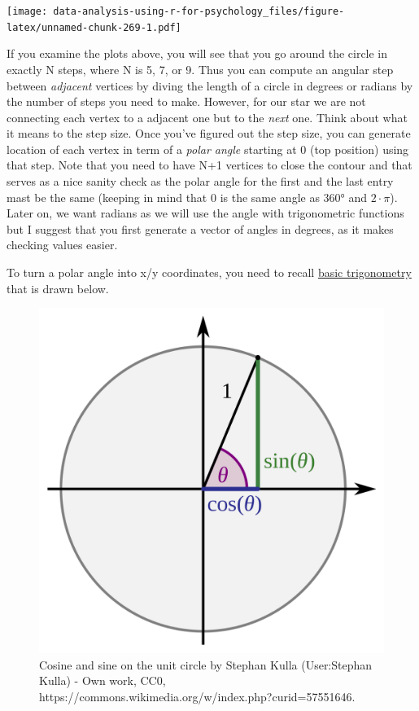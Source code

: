\documentclass[
]{book}
\begin{document}
\texttt{[image: data-analysis-using-r-for-psychology\_files/figure-latex/unnamed-chunk-269-1.pdf]}

If you examine the plots above, you will see that you go around the circle in exactly N steps, where N is 5, 7, or 9. Thus you can compute an angular step between \emph{adjacent} vertices by diving the length of a circle in degrees or radians by the number of steps you need to make. However, for our star we are not connecting each vertex to a adjacent one but to the \emph{next} one. Think about what it means to the step size. Once you've figured out the step size, you can generate location of each vertex in term of a \emph{polar angle} starting at 0 (top position) using that step. Note that you need to have N+1 vertices to close the contour and that serves as a nice sanity check as the polar angle for the first and the last entry mast be the same (keeping in mind that 0 is the same angle as 360° and \(2\cdot\pi\)). Later on, we want radians as we will use the angle with trigonometric functions but I suggest that you first generate a vector of angles in degrees, as it makes checking values easier.

To turn a polar angle into x/y coordinates, you need to recall \href{https://en.wikipedia.org/wiki/List_of_trigonometric_identities}{basic trigonometry} that is drawn below.

\begin{figure}

{\centering \includegraphics[width=0.5\linewidth]{images/cos_sin_on_unit_circle} 

}

\caption{Cosine and sine on the unit circle by Stephan Kulla (User:Stephan Kulla) - Own work, CC0, https://commons.wikimedia.org/w/index.php?curid=57551646.}\label{fig:unnamed-chunk-270}
\end{figure}
\end{document}
